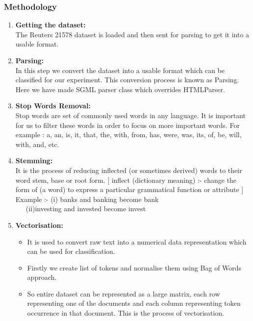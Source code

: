 \documentclass{beamer}
\newcommand\tab[1][1cm]{\hspace*{#1}}
\begin{document}
\begin{frame}[t, allowframebreaks]

\frametitle{\tab \tab \tab \tab \quad \huge Methodology}
\footnotesize
\begin{enumerate}
\item \textbf{Getting the dataset:}\\
The Reuters 21578 dataset is loaded and then sent for parsing to get it into a usable format.

\item \textbf{Parsing:}\\
In this step we convert the dataset into a usable format which can be classified for our experiment. This
conversion process is known as Parsing. Here we have made SGML parser class which overrides
HTMLParser.

\item \textbf{Stop Words Removal:} \\
Stop words are set of commonly used words in any language. It is important for us to filter these words in
order to focus on more important words. For example : a, an, is, it, that, the, with, from, has, were, was, its,
of, be, will, with, and, etc.

\item \textbf{Stemming:} \\
It is the process of reducing inflected (or sometimes derived) words to their word stem, base or root form.
[ inflect (dictionary meaning) :- change the form of (a word) to express a particular grammatical function or
attribute ] \\
Example :- (i) banks and banking become bank \\
\tab \quad \ \ \ (ii)investing and invested become invest 
\linebreak

\item \textbf{Vectorisation:}\\
\begin{itemize}
\item It is used to convert raw text into a numerical data representation which can be used for classification.
\item Firstly we create list of tokens and normalise them using Bag of Words approach.
\item So entire dataset can be represented as a large matrix, each row representing one of the documents and each column representing token occurrence in that document. This is the process of vectorisation.
\end{itemize}


\end{enumerate}
\end{frame}
\end{document}
